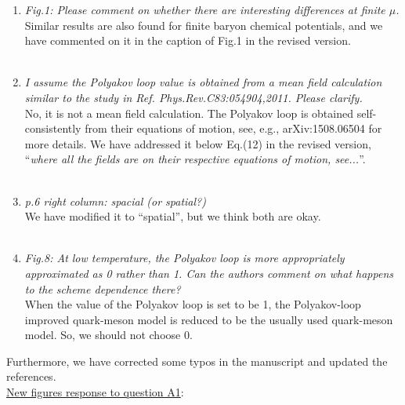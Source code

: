 \documentclass[aps,article,author-year,notitlepage,showpacs]{revtex4-1}
\begin{document}
\begin{enumerate}[1.]
\item {\it Fig.1: Please comment on whether there are interesting differences at finite $\mu$.}\\

Similar results are also found for finite baryon chemical potentials, and we have commented on it in the caption of Fig.1 in the revised version.\\[0.3ex] 

\item {\it I assume the Polyakov loop value is obtained from a mean field calculation similar
to the study in Ref. Phys.Rev.C83:054904,2011. Please clarify.}\\

No, it is not a mean field calculation. The Polyakov loop is obtained self-consistently from their equations of motion, see, e.g., arXiv:1508.06504 for more details. We have addressed it below Eq.(12) in the revised version,  ``{\it where all the fields are on their respective equations of motion, see...}''.\\[0.3ex] 

\item {\it p.6 right column: spacial (or spatial?)}\\

We have modified it to ``spatial'', but we think both are okay.\\[0.3ex] 

\item {\it Fig.8: At low temperature, the Polyakov loop is more appropriately approximated as 0 rather than 1. Can the authors comment on what happens to the scheme dependence there?}\\

When the value of the Polyakov loop is set to be 1, the Polyakov-loop improved quark-meson model is reduced to be the usually used quark-meson model. So, we should not choose 0.\\[0.3cm] 

\end{enumerate}

Furthermore, we have corrected some typos in the manuscript and updated the references.\\[0.3cm] 


\noindent \underline{New figures response to question A1}:\\
\end{document}
